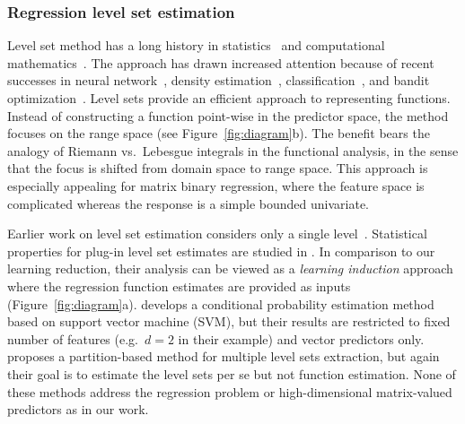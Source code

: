 \documentclass[11pt]{article}
\theoremstyle{plain}
\theoremstyle{definition}
\begin{document}
\subsubsection{Regression level set estimation}
Level set method has a long history in statistics~\citep{tsybakov1997nonparametric} and computational mathematics~\citep{gibou2018review}. The approach has drawn increased attention because of recent successes in neural network~\citep{atzmon2019controlling}, density estimation~\citep{chen2017density}, classification~\citep{varshney2010classification}, and bandit optimization~\citep{shekhar2019multiscale}. Level sets provide an efficient approach to representing functions. Instead of constructing a function point-wise in the predictor space, the method focuses on the range space (see Figure~\ref{fig:diagram}b). The benefit bears the analogy of Riemann vs.\ Lebesgue integrals in the functional analysis, in the sense that the focus is shifted from domain space to range space. This approach is especially appealing for matrix binary regression, where the feature space is complicated whereas the response is a simple bounded univariate.  
  
Earlier work on level set estimation considers only a single level~\citep{tsybakov1997nonparametric,singh2009adaptive}. Statistical properties for plug-in level set estimates are studied in \cite{audibert2007fast,rigollet2009optimal}. In comparison to our learning reduction, their analysis can be viewed as a \emph{learning induction} approach where the regression function estimates are provided as inputs (Figure~\ref{fig:diagram}a). \cite{wang2008probability} develops a conditional probability estimation method based on support vector machine (SVM), but their results are restricted to fixed number of features (e.g.\ $d=2$ in their example) and vector predictors only. \cite{singh2009adaptive} proposes a partition-based method for multiple level sets extraction, but again their goal is to estimate the level sets per se but not function estimation.  None of these methods address the regression problem or high-dimensional matrix-valued predictors as in our work. 
 
\end{document}
